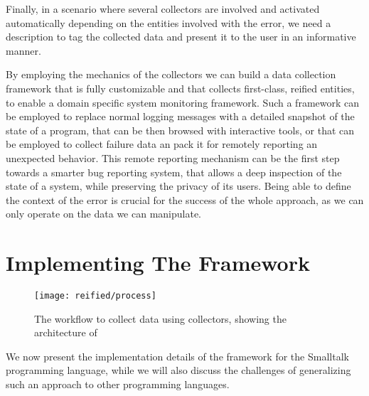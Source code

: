 Finally, in a scenario where several collectors are involved and activated automatically depending on the entities involved with the error, we need a description to tag the collected data and present it to the user in an informative manner.

By employing the mechanics of the collectors we can build a data collection framework that is fully customizable and that collects first-class, reified entities, to enable a domain specific system monitoring framework. Such a framework can be employed to replace normal logging messages with a detailed snapshot of the state of a program, that can be then browsed with interactive tools, or that can be employed to collect failure data an pack it for remotely reporting an unexpected behavior.
This remote reporting mechanism can be the first step towards a smarter bug reporting system, that allows a deep inspection of the state of a system, while preserving the privacy of its users. Being able to define the context of the error is crucial for the success of the whole approach, as we can only operate on the data we can manipulate.


\section{Implementing The Framework} \label{sec:implementation}

\begin{figure*}[ht]
  \centering
  \texttt{[image: reified/process]}
  \caption{The workflow to collect data using collectors, showing the architecture of \sln}
  \label{fig:architecture}
\end{figure*}

We now present the implementation details of the framework for the Smalltalk programming language, while  we will also discuss the challenges of generalizing such an approach to other programming languages.

